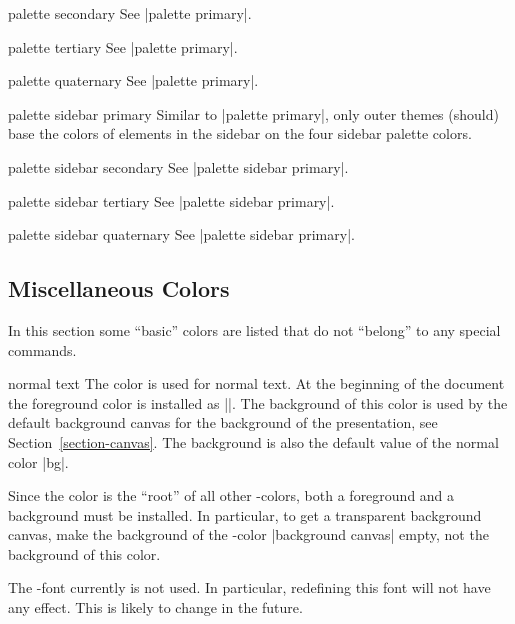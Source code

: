 \begin{element}{palette secondary}\no\yes\no
  See |palette primary|.
\end{element}

\begin{element}{palette tertiary}\no\yes\no
  See |palette primary|.
\end{element}

\begin{element}{palette quaternary}\no\yes\no
  See |palette primary|.
\end{element}

\begin{element}{palette sidebar primary}\no\yes\no
  Similar to |palette primary|, only outer themes (should) base the
  colors of elements in the sidebar on the four sidebar palette
  colors.
\end{element}

\begin{element}{palette sidebar secondary}\no\yes\no
  See |palette sidebar primary|.
\end{element}

\begin{element}{palette sidebar tertiary}\no\yes\no
  See |palette sidebar primary|.
\end{element}

\begin{element}{palette sidebar quaternary}\no\yes\no
  See |palette sidebar primary|.
\end{element}



\subsection{Miscellaneous  Colors}

In this section some ``basic'' colors are listed that do not
``belong'' to any special commands.

\begin{element}{normal text}\no\yes\yes
  The color is used for normal text. At the beginning of
  the document the foreground color is installed as
  |\normalcolor|. The background of this color is used by the
  default background canvas for the background of the
  presentation, see Section~\ref{section-canvas}. The background is
  also the default value of the normal color |bg|.

  Since the color is the ``root'' of all other \beamer-colors, both a
  foreground and a background must be installed. In particular, to get
  a transparent background canvas, make the background of the
  \beamer-color |background canvas| empty, not the background of this
  color.

  The \beamer-font currently is not used. In particular, redefining this
  font will not have any effect. This is likely to change in the future.
\end{element}

